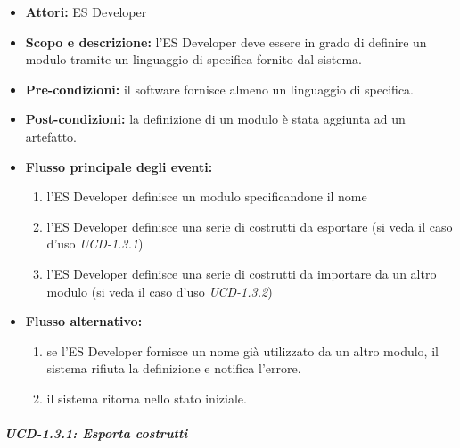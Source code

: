 \begin{itemize}
	\item \textbf{Attori:} ES Developer
	\item \textbf{Scopo e descrizione:} l'ES Developer deve essere in grado di definire un modulo tramite un linguaggio di specifica fornito dal sistema.
	\item \textbf{Pre-condizioni:} il software fornisce almeno un linguaggio di specifica.
	\item \textbf{Post-condizioni:} la definizione di un modulo è stata aggiunta ad un artefatto.
	\item \textbf{Flusso principale degli eventi:}
		\begin{enumerate}
			\item l'ES Developer definisce un modulo specificandone il nome
			\item l'ES Developer definisce una serie di costrutti da esportare (si veda il caso d'uso \emph{UCD-1.3.1})
			\item l'ES Developer definisce una serie di costrutti da importare da un altro modulo (si veda il caso d'uso \emph{UCD-1.3.2})
		\end{enumerate}
		
	\item \textbf{Flusso alternativo:} 
		\begin{enumerate}
			\setcounter{enumi}{0}
			\item se l'ES Developer fornisce un nome già utilizzato da un altro modulo, il sistema rifiuta la definizione e notifica l'errore.
			\item il sistema ritorna nello stato iniziale.
		\end{enumerate}
		
\end{itemize}

\subparagraph{UCD-1.3.1: Esporta costrutti}

